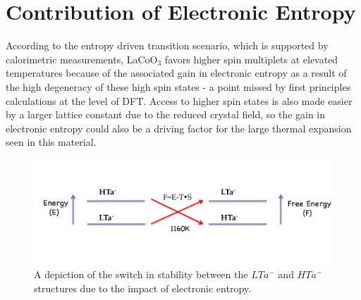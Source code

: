 \documentclass[10pt]{ruthesis}
\begin{document}
{ 







\section{Contribution of Electronic Entropy} 
According to the entropy driven transition scenario, which is supported by calorimetric measurements\cite{Stolen}, LaCoO$_3$ favors higher spin multiplets  at elevated temperatures because of the  associated gain in electronic entropy as a result of the high degeneracy of these high spin states - a point missed by first principles calculations at the level of DFT. Access to higher spin states is also made easier by a larger lattice constant due to the reduced crystal field, so the gain in electronic entropy could also be a driving factor for the large thermal expansion seen in this material.
\begin{figure}[H]
 \begin{center}
 \includegraphics[width=\columnwidth]{Entropy_swap.jpg}
 \caption{A depiction of the switch in stability between the $LTa^-$ and $HTa^-$  structures due to the impact of electronic entropy.}\label{Entropy_Swap}
 \end{center}
 \end{figure}

}
\end{document}
